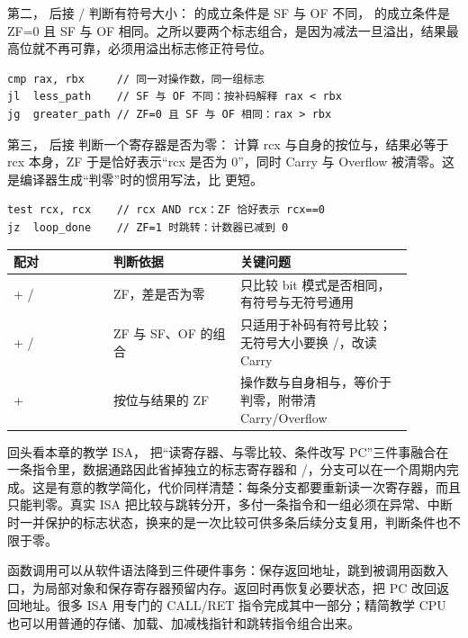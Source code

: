 第二， 后接 / 判断有符号大小： 的成立条件是 SF 与 OF 不同， 的成立条件是 ZF=0 且 SF 与 OF 相同。之所以要两个标志组合，是因为减法一旦溢出，结果最高位就不再可靠，必须用溢出标志修正符号位。

\begin{lstlisting}
cmp rax, rbx     // 同一对操作数，同一组标志
jl  less_path    // SF 与 OF 不同：按补码解释 rax < rbx
jg  greater_path // ZF=0 且 SF 与 OF 相同：rax > rbx
\end{lstlisting}

第三， 后接  判断一个寄存器是否为零： 计算 rcx 与自身的按位与，结果必等于 rcx 本身，ZF 于是恰好表示“rcx 是否为 0”，同时 Carry 与 Overflow 被清零。这是编译器生成“判零”时的惯用写法，比  更短。

\begin{lstlisting}
test rcx, rcx    // rcx AND rcx：ZF 恰好表示 rcx==0
jz  loop_done    // ZF=1 时跳转：计数器已减到 0
\end{lstlisting}

\begin{longtable}{L{0.22\linewidth}L{0.28\linewidth}L{0.38\linewidth}}
\toprule
配对 & 判断依据 & 关键问题 \\
\midrule
{} + / & ZF，差是否为零 & 只比较 bit 模式是否相同，有符号与无符号通用 \\
 + / & ZF 与 SF、OF 的组合 & 只适用于补码有符号比较；无符号大小要换 /，改读 Carry \\
 +  & 按位与结果的 ZF & 操作数与自身相与，等价于判零，附带清 Carry/Overflow \\
\bottomrule
\end{longtable}

回头看本章的教学 ISA， 把“读寄存器、与零比较、条件改写 PC”三件事融合在一条指令里，数据通路因此省掉独立的标志寄存器和 /，分支可以在一个周期内完成。这是有意的教学简化，代价同样清楚：每条分支都要重新读一次寄存器，而且只能判零。真实 ISA 把比较与跳转分开，多付一条指令和一组必须在异常、中断时一并保护的标志状态，换来的是一次比较可供多条后续分支复用，判断条件也不限于零。

函数调用可以从软件语法降到三件硬件事务：保存返回地址，跳到被调用函数入口，为局部对象和保存寄存器预留内存。返回时再恢复必要状态，把 PC 改回返回地址。很多 ISA 用专门的 CALL/RET 指令完成其中一部分；精简教学 CPU 也可以用普通的存储、加载、加减栈指针和跳转指令组合出来。

